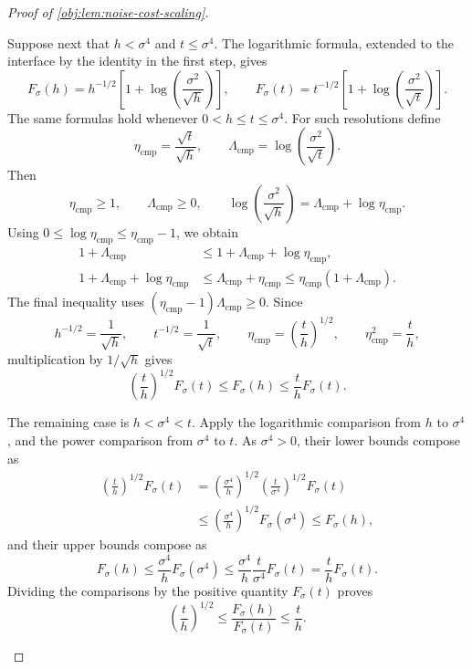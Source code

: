 \documentclass[11pt]{article}
\begin{document}
\begin{proof}[Proof of \cref{obj:lem:noise-cost-scaling}]
\begin{enumerate}
Suppose next that \(h<\sigma^4\) and \(t\le\sigma^4\). The logarithmic formula, extended to the interface by the identity in the first step, gives
\[
F_\sigma(h)=h^{-1/2}
 \left[1+\log\left(\frac{\sigma^2}{\sqrt h}\right)\right],
\qquad
F_\sigma(t)=t^{-1/2}
 \left[1+\log\left(\frac{\sigma^2}{\sqrt t}\right)\right].
\]
The same formulas hold whenever \(0<h\le t\le\sigma^4\).
For such resolutions define
\[
\eta_{\mathrm{cmp}}=\frac{\sqrt t}{\sqrt h},
\qquad
\Lambda_{\mathrm{cmp}}=\log\left(\frac{\sigma^2}{\sqrt t}\right).
\]
Then
\[
\eta_{\mathrm{cmp}}\ge1,\qquad
\Lambda_{\mathrm{cmp}}\ge0,\qquad
\log\left(\frac{\sigma^2}{\sqrt h}\right)
=\Lambda_{\mathrm{cmp}}+\log\eta_{\mathrm{cmp}}.
\]
Using \(0\le\log\eta_{\mathrm{cmp}}\le\eta_{\mathrm{cmp}}-1\), we obtain
\[
\begin{aligned}
1+\Lambda_{\mathrm{cmp}}
&\le1+\Lambda_{\mathrm{cmp}}+\log\eta_{\mathrm{cmp}},\\
1+\Lambda_{\mathrm{cmp}}+\log\eta_{\mathrm{cmp}}
&\le\Lambda_{\mathrm{cmp}}+\eta_{\mathrm{cmp}}
\le\eta_{\mathrm{cmp}}(1+\Lambda_{\mathrm{cmp}}).
\end{aligned}
\]
The final inequality uses
\((\eta_{\mathrm{cmp}}-1)\Lambda_{\mathrm{cmp}}\ge0\).
Since
\[
h^{-1/2}=\frac1{\sqrt h},\qquad
t^{-1/2}=\frac1{\sqrt t},\qquad
\eta_{\mathrm{cmp}}=\left(\frac th\right)^{1/2},
\qquad
\eta_{\mathrm{cmp}}^2=\frac th,
\]
multiplication by \(1/\sqrt h\) gives
\[
\left(\frac th\right)^{1/2}F_\sigma(t)
\le F_\sigma(h)
\le\frac th F_\sigma(t).
\]

The remaining case is \(h<\sigma^4<t\). Apply the logarithmic comparison from \(h\) to \(\sigma^4\), and the power comparison from \(\sigma^4\) to \(t\). As \(\sigma^4>0\), their lower bounds compose as
\[
\begin{aligned}
\left(\frac th\right)^{1/2}F_\sigma(t)
&=\left(\frac{\sigma^4}{h}\right)^{1/2}
  \left(\frac{t}{\sigma^4}\right)^{1/2}F_\sigma(t)\\
&\le\left(\frac{\sigma^4}{h}\right)^{1/2}F_\sigma(\sigma^4)
\le F_\sigma(h),
\end{aligned}
\]
and their upper bounds compose as
\[
F_\sigma(h)
\le\frac{\sigma^4}{h}F_\sigma(\sigma^4)
\le\frac{\sigma^4}{h}\frac{t}{\sigma^4}F_\sigma(t)
=\frac th F_\sigma(t).
\]
Dividing the comparisons by the positive quantity \(F_\sigma(t)\) proves
\[
\left(\frac th\right)^{1/2}
\le\frac{F_\sigma(h)}{F_\sigma(t)}
\le\frac th.
\]


\end{enumerate}
\end{proof}
\end{document}
